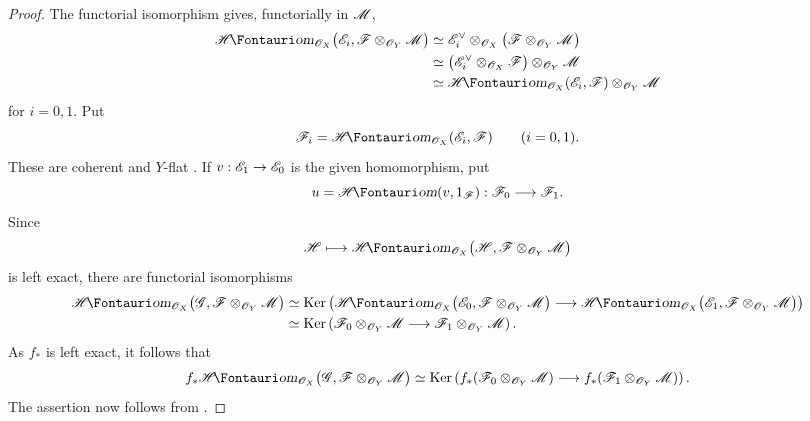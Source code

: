 \begin{proof}
The functorial isomorphism  gives,
functorially in $\mathscr{M}$,
\begin{align*}
  \shHom_{\sh{O}_X}
    \bigl(\sh{E}_i,
      \sh{F}\otimes_{\sh{O}_Y}\sh{M}\bigr)
  &\simeq
  \sh{E}_i^\vee
    \otimes_{\sh{O}_X}
    \bigl(\sh{F}\otimes_{\sh{O}_Y}\sh{M}\bigr)\\
  &\simeq
  \bigl(
    \sh{E}_i^\vee\otimes_{\sh{O}_X}\sh{F}
  \bigr)
  \otimes_{\sh{O}_Y}\sh{M}\\
  &\simeq
  \shHom_{\sh{O}_X}(\sh{E}_i,\sh{F})
  \otimes_{\sh{O}_Y}\sh{M}
\end{align*}
for $i=0,1$.  Put
\[
  \sh{F}_i
  =
  \shHom_{\sh{O}_X}(\sh{E}_i,\sh{F})
  \qquad(i=0,1).
\]
These are coherent  and $Y$-flat
.  If
$v:\mathscr{E}_1\to\mathscr{E}_0$ is the given homomorphism, put
\[
  u=\shHom(v,1_{\sh{F}}):\sh{F}_0\longrightarrow\sh{F}_1.
\]
Since
\[
  \sh{H}\longmapsto
  \shHom_{\sh{O}_X}
  \bigl(\sh{H},
    \sh{F}\otimes_{\sh{O}_Y}\sh{M}\bigr)
\]
is left exact, there are functorial isomorphisms
\begin{align*}
  \shHom_{\sh{O}_X}
  \bigl(\sh{G},
    \sh{F}\otimes_{\sh{O}_Y}\sh{M}\bigr)
  &\simeq
  \Ker\left(
    \shHom_{\sh{O}_X}
      \bigl(\sh{E}_0,
        \sh{F}\otimes_{\sh{O}_Y}\sh{M}\bigr)
    \longrightarrow
    \shHom_{\sh{O}_X}
      \bigl(\sh{E}_1,
        \sh{F}\otimes_{\sh{O}_Y}\sh{M}\bigr)
  \right)\\
  &\simeq
  \Ker\left(
    \sh{F}_0\otimes_{\sh{O}_Y}\sh{M}
    \longrightarrow
    \sh{F}_1\otimes_{\sh{O}_Y}\sh{M}
  \right).
\end{align*}
As $f_*$ is left exact, it follows that
\[
  f_*\shHom_{\sh{O}_X}
  \bigl(\sh{G},
    \sh{F}\otimes_{\sh{O}_Y}\sh{M}\bigr)
  \simeq
  \Ker\left(
    f_*(\sh{F}_0\otimes_{\sh{O}_Y}\sh{M})
    \longrightarrow
    f_*(\sh{F}_1\otimes_{\sh{O}_Y}\sh{M})
  \right).
\]
The assertion now follows from .
\end{proof}

